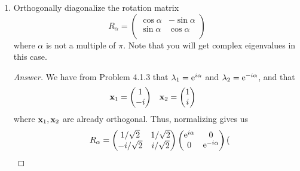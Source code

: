 \documentclass[../psets.tex]{subfiles}
\begin{document}
\begin{enumerate}[label={\textbf{2.\arabic*.}}]
\begin{enumerate}
\begin{proof}[Answer]
\begin{align*}
                &= \norm{A\x}^2+\norm{\x}^2
            \end{align*}
            Therefore, $\norm{\x}=0$, so $\x=\bm{0}$, so $\x\in\{\bm{0}\}$, as desired.
        \end{proof}
    \end{enumerate}
    \item Orthogonally diagonalize the rotation matrix
    \begin{equation*}
        R_\alpha =
        \begin{pmatrix}
            \cos\alpha & -\sin\alpha\\
            \sin\alpha & \cos\alpha\\
        \end{pmatrix}
    \end{equation*}
    where $\alpha$ is not a multiple of $\pi$. Note that you will get complex eigenvalues in this case.
    \begin{proof}[Answer]
        We have from Problem 4.1.3 that $\lambda_1=\e[i\alpha]$ and $\lambda_2=\e[-i\alpha]$, and that
        \begin{align*}
            \x_1 &=
            \begin{pmatrix}
                1\\
                -i\\
            \end{pmatrix}&
            \x_2 &=
            \begin{pmatrix}
                1\\
                i\\
            \end{pmatrix}
        \end{align*}
        where $\x_1,\x_2$ are already orthogonal. Thus, normalizing gives us
        \begin{equation*}
            R_\alpha =
            \begin{pmatrix}
                1/\sqrt{2} & 1/\sqrt{2}\\
                -i/\sqrt{2} & i/\sqrt{2}\\
            \end{pmatrix}
            \begin{pmatrix}
                \e[i\alpha] & 0\\
                0 & \e[-i\alpha]\\
            \end{pmatrix}
            \begin{pmatrix}

\end{pmatrix}
\end{equation*}
\end{proof}
\end{enumerate}
\end{document}

